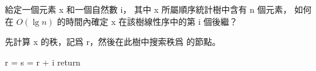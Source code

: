 \startEXERCISE
給定一個元素 x 和一個自然數 i，
其中 x 所屬順序統計樹中含有 n 個元素，
如何在 $O(\lg n)$ 的時間內確定 x 在該樹線性序中的第 i 個後繼？
\stopEXERCISE

\startANSWER
先計算 x 的秩，記爲 r，然後在此樹中搜索秩爲  的節點。

\startCLRSCODE
r = 
s = r + i
return 
\stopCLRSCODE
\stopANSWER
